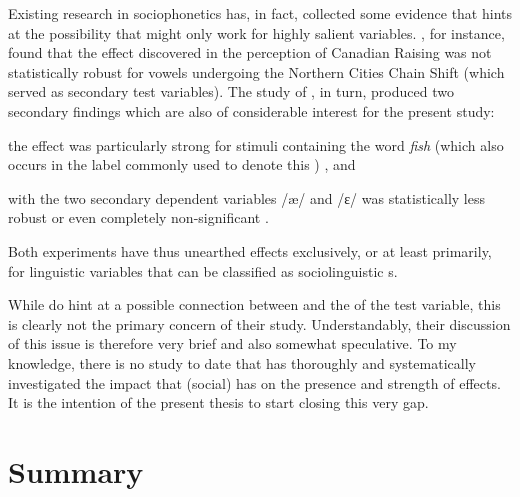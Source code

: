 Existing research in sociophonetics has, in fact, collected some evidence that hints at the possibility that   might only work for highly salient variables.
\textcite[cf.][69--75]{niedzielski1999}, for instance, found that the  effect discovered in the perception of Canadian Raising was not statistically robust for vowels undergoing the Northern Cities Chain Shift (which served as secondary test variables).
The \citeyear{hayetal2006a} study of \citeauthor{hayetal2006a}, in turn, produced two secondary findings which are also of considerable interest for the present study:
\begin{inparaenum}[(1)]
	\item the  effect was particularly strong for stimuli containing the word \emph{fish} (which also occurs in the label commonly used to denote this ) \parencite[cf.][363]{hayetal2006a}, and
	\item {} with the two secondary dependent variables /æ/ and /ɛ/ was statistically less robust or even completely non-significant \parencite[cf.][367]{hayetal2006a}.
\end{inparaenum}
Both experiments have thus unearthed  effects exclusively, or at least primarily, for linguistic variables that can be classified as sociolinguistic s.

While \textcite{hayetal2006a} do hint at a possible connection between   and the  of the test variable, this is clearly not the primary concern of their study.
Understandably, their discussion of this issue is therefore very brief and also somewhat speculative.
To my knowledge, there is no study to date that has thoroughly and systematically investigated the impact that (social)  has on the presence and strength of   effects.
It is the intention of the present thesis to start closing this very gap.

\section{Summary}

